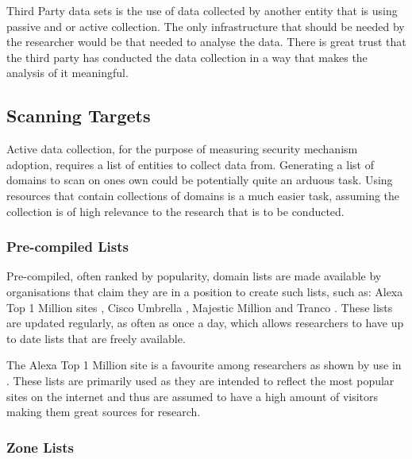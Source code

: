 \documentclass{mscreport}
\begin{document}
\vspace{0.3cm} \noindent
Third Party data sets is the use of data collected by another entity that is using passive and or active collection. The only infrastructure that should be needed by the researcher would be that needed to analyse the data. There is great trust that the third party has conducted the data collection in a way that makes the analysis of it meaningful.

\subsection{Scanning Targets}
Active data collection, for the purpose of measuring security mechanism adoption, requires a list of entities to collect data from. Generating a list of domains to scan on ones own could be potentially quite an arduous task. Using resources that contain collections of domains is a much easier task, assuming the collection is of high relevance to the research that is to be conducted.

\subsubsection{Pre-compiled Lists}
\label{subsubsec:precomplied_lists}

Pre-compiled, often ranked by popularity, domain lists are made available by organisations that claim they are in a position to create such lists, such as: Alexa Top 1 Million sites \cite{noauthor_undated-wh}, Cisco Umbrella \cite{noauthor_undated-ku}, Majestic Million \cite{noauthor_undated-sz} and Tranco \cite{noauthor_undated-mt}. These lists are updated regularly, as often as once a day, which allows researchers to have up to date lists that are freely available.

\vspace{0.3cm} \noindent
The Alexa Top 1 Million site is a favourite among researchers as shown by use in \cite{Buchanan2018-xz,Chen2016-dl,Kumar2017-qw,Patil2017-bg,Ying2016-ag,Michael2015-hn,Van_Goethem2014-ao,Holz2020-ha,Poteat2021-zr}. These lists are primarily used as they are intended to reflect the most popular sites on the internet and thus are assumed to have a high amount of visitors making them great sources for research.

\subsubsection{Zone Lists}
\end{document}

